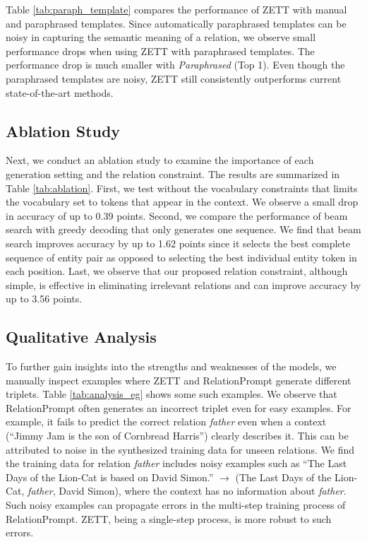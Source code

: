 Table \ref{tab:paraph_template} compares the performance of ZETT with manual and paraphrased templates. {Since automatically paraphrased templates can be noisy in capturing the semantic meaning of a relation, we observe small performance drops when using ZETT with paraphrased templates. The performance drop is much smaller with \textit{Paraphrased} (Top 1). Even though the paraphrased templates are noisy, ZETT still consistently outperforms current state-of-the-art methods.}

\subsection{Ablation Study}
\label{sec:ablation_study}
Next, we conduct an ablation study to examine the importance of each generation setting and the relation constraint. The results are summarized in Table \ref{tab:ablation}. First, {we test without the vocabulary constraints that limits the vocabulary set to tokens that appear in the context. We observe a small drop in accuracy of up to 0.39 points. Second, we compare the performance of beam search with greedy decoding that only generates one sequence. We find that beam search improves accuracy by up to 1.62 points since it selects the best complete sequence of entity pair as opposed to selecting the best individual entity token in each position. Last, we observe that our proposed relation constraint, although simple, is effective in eliminating irrelevant relations and can improve accuracy by up to 3.56 points.}

\subsection{Qualitative Analysis}

{To further gain insights into the strengths and weaknesses of the models, we manually inspect examples where ZETT and RelationPrompt generate different triplets. Table \ref{tab:analysis_eg} shows some such examples. We observe that RelationPrompt often generates an incorrect triplet even for easy examples. For example, it fails to predict the correct relation \textit{father} even when a context (``Jimmy Jam is the son of Cornbread Harris'') clearly describes it. This can be attributed to noise in the synthesized training data for unseen relations. We find the training data for relation \textit{father} includes noisy examples such as ``The Last Days of the Lion-Cat is based on David Simon.'' $\rightarrow$ (The Last Days of the Lion-Cat, \textit{father}, David Simon), where the context has no information about \textit{father}. Such noisy examples can propagate errors in the multi-step training process of RelationPrompt. ZETT, being a single-step process, is more robust to such errors.}

